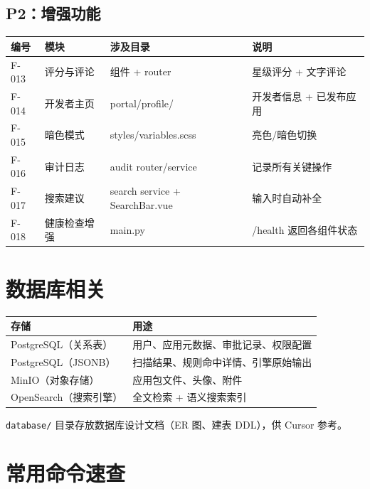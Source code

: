 \documentclass[11pt,a4paper]{article}
\begin{document}
\subsection{P2：增强功能}

\begin{table}[h]
\centering
\begin{tabularx}{\linewidth}{lllX}
\toprule
\textbf{编号} & \textbf{模块} & \textbf{涉及目录} & \textbf{说明} \\
\midrule
F-013 & 评分与评论 & 组件 + router & 星级评分 + 文字评论 \\
F-014 & 开发者主页 & portal/profile/ & 开发者信息 + 已发布应用 \\
F-015 & 暗色模式 & styles/variables.scss & 亮色/暗色切换 \\
F-016 & 审计日志 & audit router/service & 记录所有关键操作 \\
F-017 & 搜索建议 & search service + SearchBar.vue & 输入时自动补全 \\
F-018 & 健康检查增强 & main.py & /health 返回各组件状态 \\
\bottomrule
\end{tabularx}
\end{table}

\section{数据库相关}

\begin{table}[h]
\centering
\begin{tabularx}{\linewidth}{lX}
\toprule
\textbf{存储} & \textbf{用途} \\
\midrule
PostgreSQL（关系表） & 用户、应用元数据、审批记录、权限配置 \\
PostgreSQL（JSONB） & 扫描结果、规则命中详情、引擎原始输出 \\
MinIO（对象存储） & 应用包文件、头像、附件 \\
OpenSearch（搜索引擎） & 全文检索 + 语义搜索索引 \\
\bottomrule
\end{tabularx}
\end{table}

\texttt{database/} 目录存放数据库设计文档（ER 图、建表 DDL），供 Cursor 参考。

\section{常用命令速查}
\end{document}
